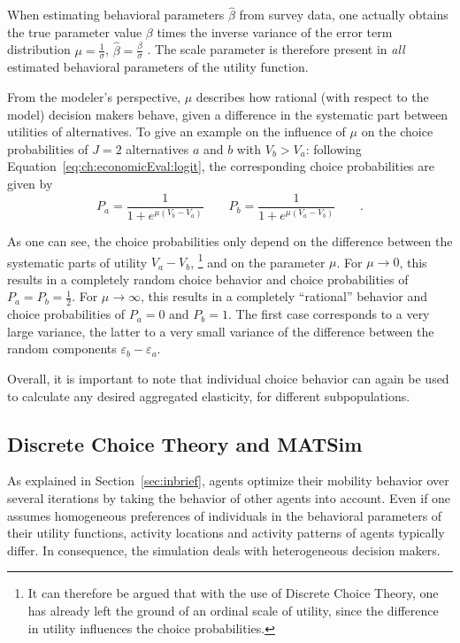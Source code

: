 %
When estimating behavioral parameters $\hat{\beta}$ from survey data, one actually obtains the true parameter value $\beta$ times the inverse variance of the error term distribution $\mu = \frac{1}{\sigma}$, \ie $\hat{\beta} = \frac{\beta}{\sigma}$ \citep[see, e.g.,][p.45, where $\sigma$ is defined as \emph{scale parameter}]{Train2003discreteChoiceBook}. The scale parameter is therefore present in \emph{all} estimated behavioral parameters of the utility function.
%

From the modeler's perspective, $\mu$ describes how rational (with respect to the model) decision makers behave, given a difference in the systematic part between utilities of alternatives. To give an example on the influence of $\mu$ on the choice probabilities of $J=2$ alternatives $a$ and $b$ with $V_b > V_a$: following Equation~\ref{eq:ch:economicEval:logit}, the corresponding choice probabilities are given by
%
\[
P_a = \frac{1}{1 + e^{\mu(V_b - V_a)}} \qquad P_b = \frac{1}{1 + e^{\mu(V_a - V_b)}} \qquad .
\]

%
As one can see, the choice probabilities only depend on the difference between the systematic parts of utility $V_a - V_b$,%
%
\footnote{
%
It can therefore be argued that with the use of Discrete Choice Theory, one has already left the ground of an ordinal scale of utility, since the difference in utility influences the choice probabilities.
%
}
%
and on the parameter $\mu$.
%
For $\mu \to 0$, this results in a completely random choice behavior and choice probabilities of $P_a = P_b = \frac{1}{2}$.
%
For $\mu \to \infty$, this results in a completely ``rational'' behavior and choice probabilities of $P_a = 0$ and $P_b = 1$.
%
The first case corresponds to a very large variance, the latter to a very small variance of the difference between the random components $\varepsilon_b - \varepsilon_a$.

Overall, it is important to note that individual choice behavior can again be used to calculate any desired aggregated elasticity, \eg for different subpopulations.


\subsection{Discrete Choice Theory and MATSim}
\label{ch:economicEval:describingBehavior:discreteChoice:matsim}
%
As explained in Section~\ref{sec:inbrief},
%
%
agents optimize their mobility behavior over several iterations by taking the behavior of other agents into account. Even if one assumes homogeneous preferences of individuals in the behavioral parameters of their utility functions, activity locations and activity patterns of agents typically differ. In consequence, the simulation deals with heterogeneous decision makers.

